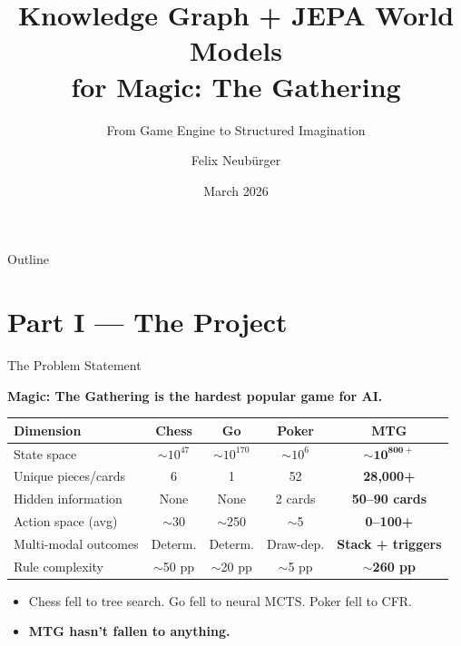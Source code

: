\documentclass[aspectratio=169, 11pt]{beamer}
\title[KG + JEPA World Models for MTG]{%
  Knowledge Graph + JEPA World Models\\
  for Magic: The Gathering}
\subtitle{From Game Engine to Structured Imagination}
\author{Felix Neub\"urger}
\date{March 2026}
\begin{document}
\begin{frame}
  \titlepage
\end{frame}

\begin{frame}{Outline}
  \tableofcontents
\end{frame}


\section{Part I --- The Project}

\begin{frame}{The Problem Statement}
  \begin{center}
    \large\bfseries Magic: The Gathering is the hardest popular game for AI.
  \end{center}
  \vspace{0.3cm}
  \begin{table}
    \centering\footnotesize
    \begin{tabular}{@{}lcccc@{}}
      \toprule
      \textbf{Dimension} & \textbf{Chess} & \textbf{Go} & \textbf{Poker} & \textbf{MTG} \\
      \midrule
      State space         & $\sim10^{47}$  & $\sim10^{170}$ & $\sim10^{6}$    & $\mathbf{\sim10^{800+}}$ \\
      Unique pieces/cards & 6              & 1               & 52              & \textbf{28,000+} \\
      Hidden information  & None           & None            & 2 cards         & \textbf{50--90 cards} \\
      Action space (avg)  & $\sim$30       & $\sim$250       & $\sim$5         & \textbf{0--100+} \\
      Multi-modal outcomes& Determ.        & Determ.         & Draw-dep.       & \textbf{Stack + triggers} \\
      Rule complexity     & $\sim$50 pp    & $\sim$20 pp     & $\sim$5 pp      & \textbf{$\sim$260 pp} \\
      \bottomrule
    \end{tabular}
  \end{table}
  \vspace{0.3cm}
  \begin{itemize}
    \item Chess fell to tree search. Go fell to neural MCTS. Poker fell to CFR.
    \item \textbf{MTG hasn't fallen to anything.}
  \end{itemize}
\end{frame}
\end{document}
